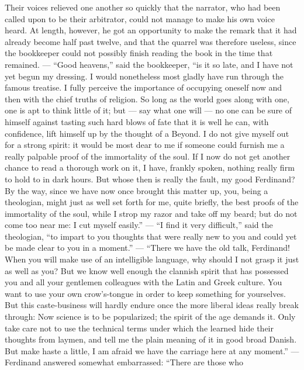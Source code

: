 \documentclass[12pt,a4paper]{article}
\newcommand{\opage}[1]{\marginnote{\footnotesize\textit{[#1]}}}
\newcommand{\aphsep}{\par\smallskip\centerline{\textasteriskcentered}\smallskip}
\begin{document}
\aphsep

Their voices relieved one another so quickly that the narrator, who had been
called upon to be their arbitrator, could not manage to make his own voice heard.
At length, however, he got an opportunity to make the remark that it had already
\opage{46}become half past twelve, and that the quarrel was therefore useless,
since the bookkeeper could not possibly finish reading the book in the time that
remained. --- ``Good heavens,'' said the bookkeeper, ``is it so late, and I have
not yet begun my dressing. I would nonetheless most gladly have run through the
famous treatise. I fully perceive the importance of occupying oneself now and then
with the chief truths of religion. So long as the world goes along with one, one
is apt to think little of it; but --- say what one will --- no one can be sure of
himself against tasting such hard blows of fate that it is well he can, with
confidence, lift himself up by the thought of a Beyond. I do not give myself out
for a strong spirit: it would be most dear to me if someone could furnish me a
really palpable proof of the immortality of the soul. If I now do not get another
chance to read a thorough work on it, I have, frankly spoken, nothing really firm
to hold to in dark hours. But whose then is really the fault, my good Ferdinand?
By the way, since we have now once brought this matter up, you, being a
theologian, might just as well set forth for me, quite briefly, the best proofs of
the immortality of the soul, while I strop my razor and take off my beard; but do
not come too near me: I cut myself easily.'' --- ``I find it very difficult,''
said the theologian, ``to impart to you thoughts that were really new to you and
could yet be made clear to you in a moment.'' --- ``There we have the old talk,
Ferdinand! When you will make use of an intelligible language, why should I not
grasp it just as well as you? But we know well enough the clannish spirit that has
possessed you and all your gentlemen colleagues with the Latin and Greek culture.
You want to use your own crow's-tongue in order to keep something \opage{47}for
yourselves. But this caste-business will hardly endure once the more liberal ideas
really break through: Now science is to be popularized; the spirit of the age
demands it. Only take care not to use the technical terms under which the learned
hide their thoughts from laymen, and tell me the plain meaning of it in good broad
Danish. But make haste a little, I am afraid we have the carriage here at any
moment.'' --- Ferdinand answered somewhat embarrassed: ``There are those who
\end{document}
